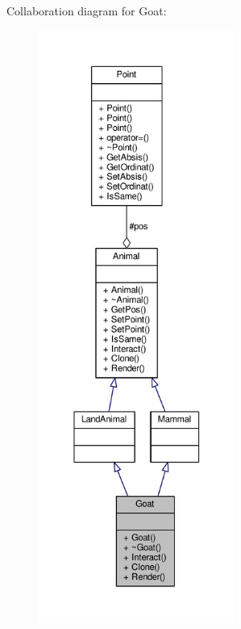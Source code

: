 Collaboration diagram for Goat\+:
\nopagebreak
\begin{figure}[H]
\begin{center}
\leavevmode
\includegraphics[height=550pt]{classGoat__coll__graph}
\end{center}
\end{figure}
